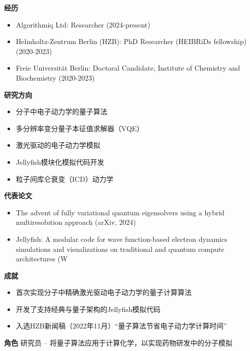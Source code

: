 \par{\footnotesize\color{mainred}\textbf{经历}}
\begin{itemize}[leftmargin=1.2em,itemsep=0pt,topsep=0pt]
\item {\footnotesize Algorithmiq Ltd: Researcher (2024-present)}
\item {\footnotesize Helmholtz-Zentrum Berlin (HZB): PhD Researcher (HEIBRiDs fellowship) (2020-2023)}
\item {\footnotesize Freie Universität Berlin: Doctoral Candidate, Institute of Chemistry and Biochemistry (2020-2023)}
\end{itemize}
\par{\footnotesize\color{mainred}\textbf{研究方向}}
\begin{itemize}[leftmargin=1.2em,itemsep=0pt,topsep=0pt]
\item {\footnotesize 分子中电子动力学的量子算法}
\item {\footnotesize 多分辨率变分量子本征值求解器（VQE）}
\item {\footnotesize 激光驱动的电子动力学模拟}
\item {\footnotesize Jellyfish模块化模拟代码开发}
\item {\footnotesize 粒子间库仑衰变（ICD）动力学}
\end{itemize}
\par{\footnotesize\color{mainred}\textbf{代表论文}}
\begin{itemize}[leftmargin=1.2em,itemsep=0pt,topsep=0pt]
\item {\footnotesize The advent of fully variational quantum eigensolvers using a hybrid multiresolution approach (arXiv, 2024)}
\item {\footnotesize Jellyfish: A modular code for wave function-based electron dynamics simulations and visualizations on traditional and quantum compute architectures (W}
\end{itemize}
\par{\footnotesize\color{mainred}\textbf{成就}}
\begin{itemize}[leftmargin=1.2em,itemsep=0pt,topsep=0pt]
\item {\footnotesize 首次实现分子中精确激光驱动电子动力学的量子计算算法}
\item {\footnotesize 开发了支持经典与量子架构的Jellyfish模拟代码}
\item {\footnotesize 入选HZB新闻稿（2022年11月）“量子算法节省电子动力学计算时间”}
\end{itemize}
\par{\footnotesize\color{mainred}\textbf{角色}} {\footnotesize 研究员 -- 将量子算法应用于计算化学，以实现药物研发中的分子模拟}
